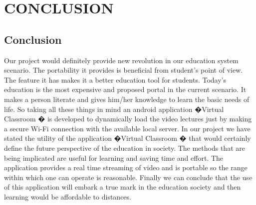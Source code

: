 \chapter{CONCLUSION}
\section{Conclusion}

Our project would definitely provide new revolution in our education system scenario. The portability it provides is beneficial from student’s point of view. The feature it has makes it a better education tool for students. Today’s education is the most expensive and proposed portal in the current scenario. It makes a person literate and gives him/her knowledge to learn the basic needs of life. So taking all these things in mind an android application  �Virtual Classroom � is developed to dynamically load the video lectures just by making a secure Wi-Fi connection with the available local server. In our project we have stated the utility of the application  �Virtual Classroom � that would certainly define the future perspective of the education in society. The methods that are being implicated are useful for learning and saving time and effort. The application provides a real time streaming of video and is portable so the range within which one can operate is reasonable. Finally we can conclude that the use of this application will embark a true mark in the education society and then learning would be affordable to distances.
